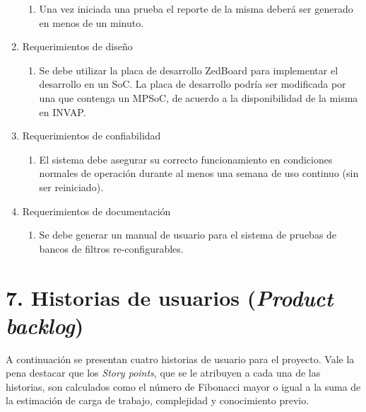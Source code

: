 \documentclass[
11pt, %
]{charter}
\begin{document}
\begin{enumerate}
\begin{enumerate}
		\item Una vez iniciada una prueba el reporte de la misma deberá ser generado en menos de un minuto.
	\end{enumerate}
	\item Requerimientos de diseño
	\begin{enumerate}
		\item Se debe utilizar la placa de desarrollo ZedBoard para implementar el desarrollo en un SoC. La placa de desarrollo podría ser modificada por una que contenga un MPSoC, de acuerdo a la disponibilidad de la misma en INVAP.
	\end{enumerate}
	\item Requerimientos de confiabilidad 
	\begin{enumerate}
		\item El sistema debe asegurar su correcto funcionamiento en condiciones normales de operación durante al menos una semana de uso continuo (sin ser reiniciado).
	\end{enumerate}
	\item Requerimientos de documentación
	\begin{enumerate}
		\item Se debe generar un manual de usuario para el sistema de pruebas de bancos de filtros re-configurables.
	\end{enumerate}
\end{enumerate}

\section{7. Historias de usuarios (\textit{Product backlog})}
\label{sec:backlog}

A continuación se presentan cuatro historias de usuario para el proyecto. Vale la pena destacar que los \emph{Story points}, que se le atribuyen a cada una de las historias, son calculados como el número de Fibonacci mayor o igual a la suma de la estimación de carga de trabajo, complejidad y conocimiento previo.
\end{document}
